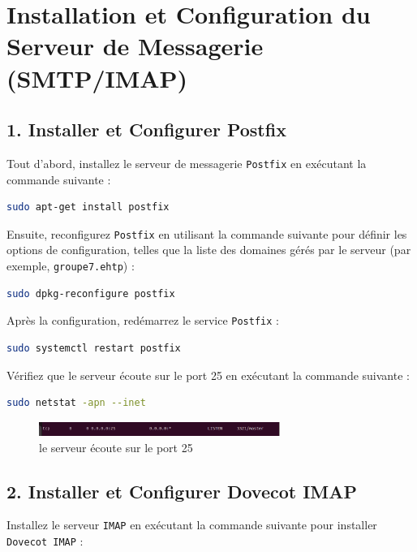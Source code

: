 \newpage



\section{Installation et Configuration du Serveur de Messagerie (SMTP/IMAP)}

\subsection*{1. Installer et Configurer Postfix}
Tout d'abord, installez le serveur de messagerie \texttt{Postfix} en exécutant la commande suivante :

\begin{lstlisting}[language=bash]
sudo apt-get install postfix
\end{lstlisting}

Ensuite, reconfigurez \texttt{Postfix} en utilisant la commande suivante pour définir les options de configuration, telles que la liste des domaines gérés par le serveur (par exemple, \texttt{groupe7.ehtp}) :

\begin{lstlisting}[language=bash]
sudo dpkg-reconfigure postfix
\end{lstlisting}

Après la configuration, redémarrez le service \texttt{Postfix} :

\begin{lstlisting}[language=bash]
sudo systemctl restart postfix
\end{lstlisting}

Vérifiez que le serveur écoute sur le port 25 en exécutant la commande suivante :

\begin{lstlisting}[language=bash]
sudo netstat -apn --inet
\end{lstlisting}

\begin{figure}[h]
	\centering
	\includegraphics[width=0.7\textwidth]{SMTP/port.png}
	\caption{le serveur écoute sur le port 25 }
	\label{fig:cmd}
\end{figure}

\subsection*{2. Installer et Configurer Dovecot IMAP}
Installez le serveur \texttt{IMAP} en exécutant la commande suivante pour installer \texttt{Dovecot IMAP} :

